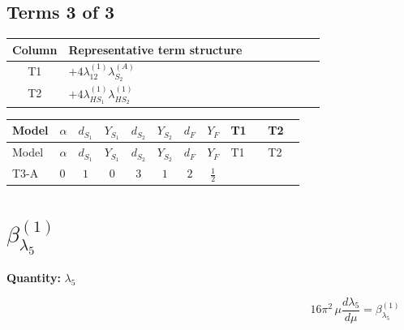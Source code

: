 \documentclass[8pt]{article}
\begin{document}
\begin{landscape}
\subsection*{Terms 3 of 3}
\begin{center}
\begin{tabular}{@{}c >{\raggedright\arraybackslash}p{0.82\linewidth}@{}}
\toprule
Column & Representative term structure \\
\midrule
T1 & \(\displaystyle +4 {\lambda_{12}^{(1)}} {\lambda_{S_2}^{(A)}}\) \\
\midrule
T2 & \(\displaystyle +4 {\lambda_{HS_1}^{(1)}} {\lambda_{HS_2}^{(1)}}\) \\
\midrule
\bottomrule
\end{tabular}
\end{center}
\smallskip
\tiny
\begin{longtable}{@{}llcccccc >{\raggedright\arraybackslash}p{0.21\linewidth} >{\raggedright\arraybackslash}p{0.21\linewidth}@{}}
\toprule
Model & $\alpha$ & $d_{S_1}$ & $Y_{S_1}$ & $d_{S_2}$ & $Y_{S_2}$ & $d_F$ & $Y_F$ & T1 & T2 \\
\midrule
\endfirsthead
\toprule
Model & $\alpha$ & $d_{S_1}$ & $Y_{S_1}$ & $d_{S_2}$ & $Y_{S_2}$ & $d_F$ & $Y_F$ & T1 & T2 \\
\midrule
\endhead
T3-A & $0$ & $1$ & $0$ & $3$ & $1$ & $2$ & $\frac{1}{2}$ & \scriptsize\adjustbox{max width=\linewidth}{$\begin{gathered} +4 {\lambda_{12}^{(1)}} {\lambda_{S_2}^{(A)}}\end{gathered}$} & \scriptsize\adjustbox{max width=\linewidth}{$\begin{gathered} +4 {\lambda_{HS_1}^{(1)}} {\lambda_{HS_2}^{(1)}}\end{gathered}$} \\
\midrule
\bottomrule
\end{longtable}
\clearpage
\section*{$\beta_{\lambda_5}^{(1)}$}
\noindent\textbf{Quantity: }$\lambda_5$\par\smallskip
\[16\pi^2\,\mu\frac{d \lambda_5}{d\mu}=\beta_{\lambda_5}^{(1)}\]

\end{landscape}
\end{document}
